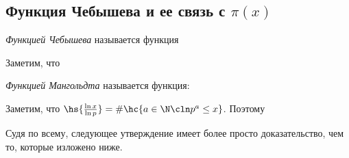 \documentclass[a4paper]{article}
\begin{document}
\subsection{Функция Чебышева и ее связь с $\pi(x)$}

\begin{df}
\emph{Функцией Чебышева} называется функция
\end{df}

Заметим, что

\begin{df}
\emph{Функцией Мангольдта} называется функция:
\end{df}

Заметим, что $\hs{\frac{\ln x}{\ln p}}= \#\hc{a \in \N\cln p^a\le x}$. Поэтому


\begin{petit}
Судя по всему, следующее утверждение имеет более просто доказательство, чем то, которые изложено ниже.
\end{petit}
\end{document}
